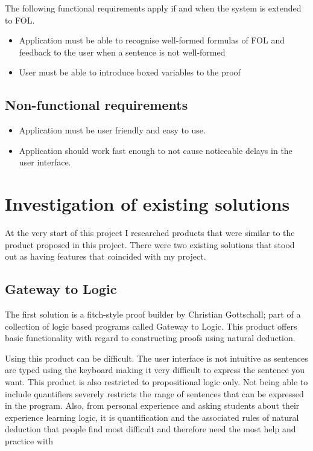The following functional requirements apply if and when the system is extended to FOL.

\begin{itemize}


\item{Application must be able to recognise well-formed formulas of FOL and feedback to the user when a sentence is not well-formed}

\item{User must be able to introduce boxed variables to the proof}
\end{itemize}




\subsection{Non-functional requirements}

\begin{itemize}
\item{Application must be user friendly and easy to use}.
\item{Application should work fast enough to not cause noticeable delays in the user interface.}
\end{itemize}







\section{Investigation of existing solutions}

At the very start of this project I researched products that were similar to the product proposed in this project. There were two existing solutions that stood out as having features that coincided with my project.

\subsection{Gateway to Logic}
The first solution is a fitch-style proof builder by Christian Gottschall; part of a collection of logic based programs called Gateway to Logic. This product offers basic functionality with regard to constructing proofs using natural deduction.

Using this product can be difficult. The user interface is not intuitive as sentences are typed using the keyboard making it very difficult to express the sentence you want. This product is also restricted to propositional logic only. Not being able to include quantifiers severely restricts the range of sentences that can be expressed in the program. Also, from personal experience and asking students about their experience learning logic, it is quantification and the associated rules of natural deduction that people find most difficult and therefore need the most help and practice with

